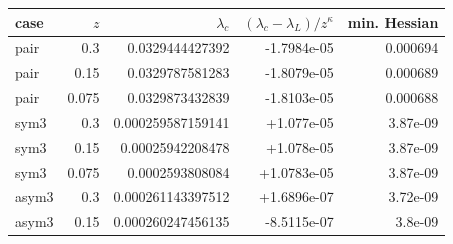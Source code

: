 \begin{tabular}{@{}lrrrr@{}}
\toprule
case & $z$ & $\lambda_c$ & $(\lambda_c-\lambda_L)/z^\kappa$ & min. Hessian\\
\midrule
pair & 0.3 & 0.0329444427392 & -1.7984e-05 & 0.000694\\
pair & 0.15 & 0.0329787581283 & -1.8079e-05 & 0.000689\\
pair & 0.075 & 0.0329873432839 & -1.8103e-05 & 0.000688\\
sym3 & 0.3 & 0.000259587159141 & +1.077e-05 & 3.87e-09\\
sym3 & 0.15 & 0.00025942208478 & +1.078e-05 & 3.87e-09\\
sym3 & 0.075 & 0.0002593808084 & +1.0783e-05 & 3.87e-09\\
asym3 & 0.3 & 0.000261143397512 & +1.6896e-07 & 3.72e-09\\
asym3 & 0.15 & 0.000260247456135 & -8.5115e-07 & 3.8e-09\\
\bottomrule
\end{tabular}
